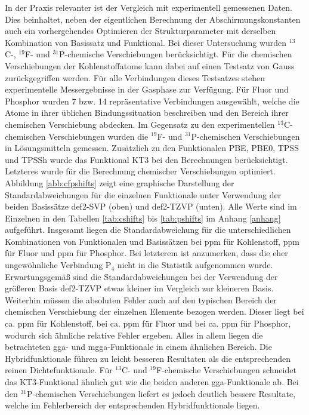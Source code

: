 \bigskip
In der Praxis relevanter ist der Vergleich mit experimentell gemessenen Daten. Dies beinhaltet, neben der eigentlichen Berechnung der Abschirmungskonstanten auch ein vorhergehendes Optimieren der Strukturparameter mit derselben Kombination von Basissatz und Funktional. Bei dieser Untersuchung wurden $^{13}$C-, $^{19}$F- und $^{31}$P-chemische Verschiebungen berücksichtigt. Für die chemischen Verschiebungen der Kohlenstoffatome kann dabei auf einen Testsatz von Gauss\supercite{gauss1993effects} zurückgegriffen werden. Für alle Verbindungen dieses Testsatzes stehen experimentelle Messergebnisse in der Gasphase zur Verfügung.\supercite{jameson1987gas} Für Fluor und Phosphor wurden 7 bzw. 14 repräsentative Verbindungen ausgewählt, welche die Atome in ihrer üblichen Bindungssituation beschreiben und den Bereich ihrer chemischen Verschiebung abdecken. Im Gegensatz zu den experimentellen $^{13}$C-chemischen Verschiebungen wurden die $^{19}$F- und $^{31}$P-chemischen Verschiebungen in Lösungsmitteln gemessen. Zusätzlich zu den Funktionalen PBE, PBE0, TPSS und TPSSh wurde das Funktional KT3\supercite{keal2004semiempirical} bei den Berechnungen berücksichtigt. Letzteres wurde für die Berechnung chemischer Verschiebungen optimiert. Abbildung \ref{abb:cfpshifts} zeigt eine graphische Darstellung der Standardabweichungen für die einzelnen Funktionale unter Verwendung der beiden Basissätze def2-SVP (oben) und def2-TZVP (unten). Alle Werte sind im Einzelnen in den Tabellen \ref{tab:cshifts} bis \ref{tab:pshifts} im Anhang \ref{anhang} aufgeführt. Insgesamt liegen die Standardabweichung für die unterschiedlichen Kombinationen von Funktionalen und Basissätzen bei \unit[3--8]{ppm} für Kohlenstoff, \unit[5--20]{ppm} für Fluor und \unit[17--34]{ppm} für Phosphor. Bei letzterem ist anzumerken, dass die eher ungewöhnliche Verbindung P$_4$ nicht in die Statistik aufgenommen wurde. Erwartungsgemäß sind die Standardabweichungen bei der Verwendung der größeren Basis def2-TZVP etwas kleiner im Vergleich zur kleineren Basis. Weiterhin müssen die absoluten Fehler auch auf den typischen Bereich der chemischen Verschiebung der einzelnen Elemente bezogen werden. Dieser liegt bei ca. \unit[200]{ppm} für Kohlenstoff, bei ca. \unit[300]{ppm} für Fluor und bei ca. \unit[500]{ppm} für Phosphor, wodurch sich ähnliche relative Fehler ergeben. Alles in allem liegen die betrachteten \ac{gga}- und \ac{mgga}-Funktionale in einem ähnlichen Bereich. Die Hybridfunktionale führen zu leicht besseren Resultaten als die entsprechenden reinen Dichtefunktionale. Für $^{13}$C- und $^{19}$F-chemische Verschiebungen schneidet das KT3-Funktional ähnlich gut wie die beiden anderen \ac{gga}-Funktionale ab. Bei den $^{31}$P-chemischen Verschiebungen liefert es jedoch deutlich bessere Resultate, welche im Fehlerbereich der entsprechenden Hybridfunktionale liegen. 

